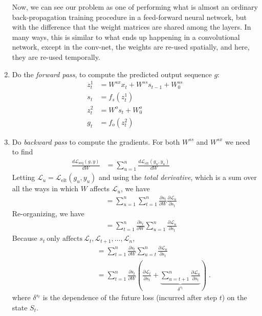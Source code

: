 \begin{enumerate}[(1)]
        Now,  we can see our problem as one of performing what is almost an
        ordinary back-propagation training procedure in a feed-forward neural
        network, but with the difference that the weight matrices are shared
        among the layers.  In many ways, this is similar to what ends up
        happening in a convolutional network, except in the conv-net, the
        weights are re-used spatially, and here, they are re-used temporally.
  \item
        Do the {\it forward pass}, to compute the predicted output sequence $g$:
        \begin{align}
          z_t^1 & = W^{sx}x_t + W^{ss}s_{t - 1} + W^{ss}_0 \\
          s_t   & = f_s(z_t^1)                             \\
          z_t^2 & = W^os_t + W_0^o                         \\
          g_t   & = f_o(z_t^2)
        \end{align}
  \item
        Do {\em backward pass} to compute the gradients. For both $W^{ss}$ and
        $W^{sx}$ we need to find
        \begin{align}
          \frac{d \mathcal{L}_\text{seq}(g,y)}{d W} & = \sum_{u = 1}^n\frac{d \mathcal{L}_\text{elt}(g_u, y_u)}{d W} ~~~~~~~~~~~~~~~~~~ \nonumber
        \end{align}
        Letting $\mathcal{L}_u = \mathcal{L}_\text{elt}(g_u, y_u)$ and using the {\em  total derivative}, which is a sum over all
        the ways in which $W$ affects $\mathcal{L}_u$, we have
        \begin{align}
          ~~~~ & = \sum_{u = 1}^n\sum_{t = 1}^n  \frac{\partial s_t}{\partial W} \frac{\partial \mathcal{L}_u}{\partial s_t}  \nonumber
        \end{align}
        Re-organizing, we have
        \begin{align}
          ~~~~ & = \sum_{t = 1}^n\frac{\partial s_t}{\partial W} \sum_{u =
            1}^n\frac{\partial \mathcal{L}_u}{\partial s_t} \nonumber
        \end{align}
        Because $s_t\ \text{only affects}\ \mathcal{L}_t, \mathcal{L}_{t + 1}, \dots, \mathcal{L}_n$,
        \begin{align}
          ~~~~~~~~~~~~~~~~~~~~ & = \sum_{t = 1}^n\frac{\partial s_t}{\partial W} \sum_{u = t}^n\frac{\partial \mathcal{L}_u}{\partial s_t} \nonumber \\
                               & = \sum_{t = 1}^n\frac{\partial s_t}{\partial W}
          \left(\frac{\partial \mathcal{L}_t}{\partial s_t} + \underbrace{\sum_{u = t +
              1}^n\frac{\partial \mathcal{L}_u}{\partial s_t}}_{\delta^{s_t}}\right) \; .\label{sumeq}
        \end{align}
        where $\delta^{s_t}$ is the dependence of the future loss (incurred after step $t$) on the
        state $S_t$.


\end{enumerate}
